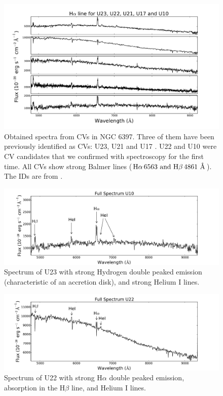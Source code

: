 \begin{figure}[]
        \centering
        \includegraphics[scale=.6]{assets/images/todostodos.pdf}
\caption{Obtained spectra from CVs in NGC 6397. Three of them have been previously identified as CVs: U23, U21 and U17 \citep{grindlay_spectroscopic_1995,edmonds_cataclysmic_1999}. U22 and  U10 were CV candidates that we confirmed with spectroscopy for the first time. All CVs show strong Balmer lines ($ \text H \alpha \, 6563 \text{ and H}\beta \,  4861 \text{ \r A}$). The IDs are from \cite{bogdanov_chandra_2010}.}
\label{fig:todosspectra}
\end{figure}

\begin{figure}[]
        \centering
        \includegraphics[scale=.5]{assets/images/U10full.pdf}
\caption{Spectrum of U23 with strong Hydrogen double peaked emission (characteristic of an accretion disk), and strong Helium I lines. }
\label{fig:U10spectra}
\end{figure}

\begin{figure}[]
        \centering
        \includegraphics[scale=.5]{assets/images/U22full.pdf}
\caption{Spectrum of U22 with strong H$\alpha$ double peaked emission, absorption in the H$\beta$ line, and Helium I lines.}
\label{fig:U22spectra}
\end{figure}


